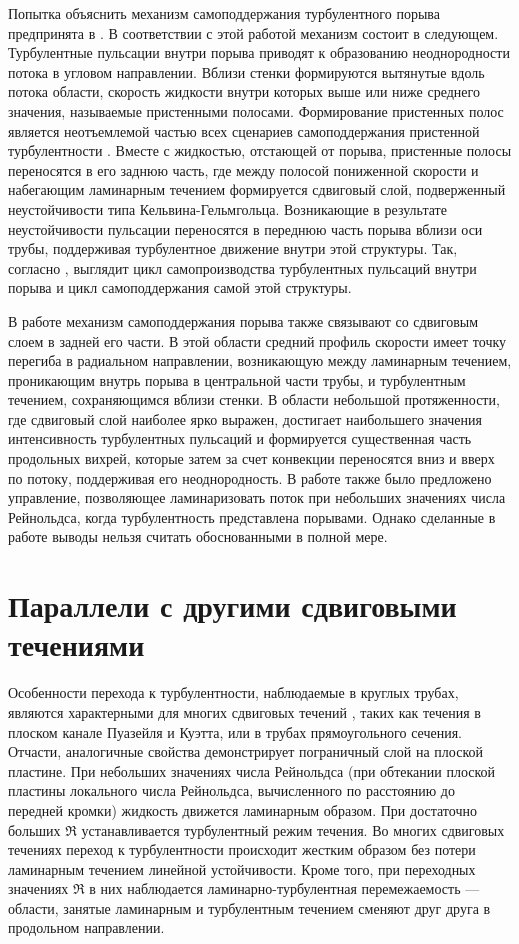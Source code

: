 Попытка объяснить механизм самоподдержания турбулентного порыва предпринята в \cite{Shimizu2009}. В соответствии с этой работой механизм состоит в следующем. Турбулентные пульсации внутри порыва приводят к образованию неоднородности потока в угловом направлении. Вблизи стенки формируются вытянутые вдоль потока области, скорость жидкости внутри которых выше или ниже среднего значения, называемые пристенными полосами. Формирование пристенных полос является неотъемлемой частью всех сценариев самоподдержания пристенной турбулентности \cite{Hamilton1995, Waleffe1997, Schoppa2002}. Вместе с жидкостью, отстающей от порыва, пристенные полосы переносятся в его заднюю часть, где между полосой пониженной скорости и набегающим ламинарным течением формируется сдвиговый слой, подверженный неустойчивости типа Кельвина-Гельмгольца. Возникающие в результате неустойчивости пульсации переносятся в переднюю часть порыва вблизи оси трубы, поддерживая турбулентное движение внутри этой структуры. Так, согласно \cite{Shimizu2009}, выглядит цикл самопроизводства турбулентных пульсаций внутри порыва и цикл самоподдержания самой этой структуры. 

В работе \cite{Hof2010} механизм самоподдержания порыва также связывают со сдвиговым слоем в задней его части. В этой области средний профиль скорости имеет точку перегиба в радиальном направлении, возникающую между ламинарным течением, проникающим внутрь порыва в центральной части трубы, и турбулентным течением, сохраняющимся вблизи стенки. В области небольшой протяженности, где сдвиговый слой наиболее ярко выражен, достигает наибольшего значения интенсивность турбулентных пульсаций и формируется существенная часть продольных вихрей, которые затем за счет конвекции переносятся вниз и вверх по потоку, поддерживая его неоднородность. В работе \cite{Hof2010} также было предложено управление, позволяющее ламинаризовать поток при небольших значениях числа Рейнольдса, когда турбулентность представлена порывами. Однако сделанные в работе выводы нельзя считать обоснованными в полной мере. 


\section{Параллели с другими сдвиговыми течениями}

Особенности перехода к турбулентности, наблюдаемые в круглых трубах, являются характерными для многих сдвиговых течений \cite{Manneville2015, Manneville2016}, таких как течения в плоском канале Пуазейля и Куэтта, или в трубах прямоугольного сечения. Отчасти, аналогичные свойства демонстрирует пограничный слой на плоской пластине. При небольших значениях числа Рейнольдса (при обтекании плоской пластины локального числа Рейнольдса, вычисленного по расстоянию до передней кромки) жидкость движется ламинарным образом. При достаточно больших $\Re$ устанавливается турбулентный режим течения. Во многих сдвиговых течениях переход к турбулентности происходит жестким образом без потери ламинарным течением линейной устойчивости. Кроме того, при переходных значениях $\Re$ в них наблюдается ламинарно-турбулентная перемежаемость --- области, занятые ламинарным и турбулентным течением сменяют друг друга в продольном направлении.  

